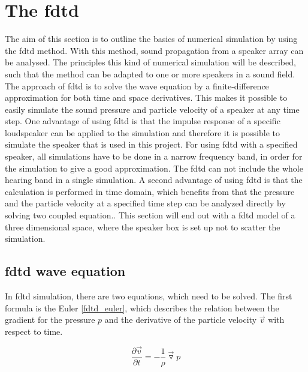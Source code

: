 \section{The \gls{fdtd}}\label{sec:fdtd}
The aim of this section is to outline the basics of numerical simulation by using the \gls{fdtd} method. With this method, sound propagation from a speaker array can be analysed. The principles this kind of numerical simulation will be described, such that the method can be adapted to one or more speakers in a sound field. 
The approach of \gls{fdtd} is to solve the wave equation by a finite-difference approximation for both time and space derivatives. This makes it possible to easily simulate the sound pressure and particle velocity of a speaker at any time step. One advantage of using \gls{fdtd} is that the impulse response of a specific loudspeaker can be applied to the simulation and therefore it is possible to simulate the speaker that is used in this project. For using \gls{fdtd} with a specified speaker, all simulations have to be done in a narrow frequency band, in order for the simulation to give a good approximation. The \gls{fdtd} can not include the whole hearing band in a single simulation. A second advantage of using \gls{fdtd} is that the calculation is performed in time domain, which benefits from that the pressure and the particle velocity at a specified time step can be analyzed directly by solving two coupled equation.\citep{fdtddaga}. This section will end out with a \gls{fdtd} model of a three dimensional space, where the speaker box is set up not to scatter the simulation.\\

\subsection{\gls{fdtd} wave equation}
In \gls{fdtd} simulation, there are two equations, which need to be solved. The first formula is the Euler \autoref{fdtd_euler}, which describes the relation between the gradient for the pressure $p$ and the derivative of the particle velocity $\vec{v}$ with respect to time. 

\begin{equation}\label{fdtd_euler}
\frac{\partial \vec{v}}{\partial t} =- \frac{1}{\rho}\vec{\triangledown }p
\end{equation}

    \startexplain
    \stopexplain

